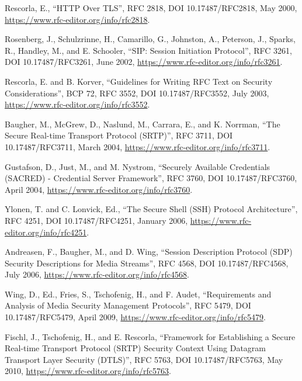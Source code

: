 \documentclass{article}
\begin{document}
\begin{description}[style=nextline, labelwidth=10em, leftmargin=10em]
\item[{[RFC2818]}] Rescorla, E., ``HTTP Over TLS'', RFC 2818,
   DOI 10.17487/RFC2818, May 2000,
   \url{https://www.rfc-editor.org/info/rfc2818}.

\item[{[RFC3261]}] Rosenberg, J., Schulzrinne, H., Camarillo, G., Johnston,
   A., Peterson, J., Sparks, R., Handley, M., and E.
   Schooler, ``SIP: Session Initiation Protocol'', RFC 3261,
   DOI 10.17487/RFC3261, June 2002,
   \url{https://www.rfc-editor.org/info/rfc3261}.

\item[{[RFC3552]}] Rescorla, E. and B. Korver, ``Guidelines for Writing RFC
   Text on Security Considerations'', BCP 72, RFC 3552,
   DOI 10.17487/RFC3552, July 2003,
   \url{https://www.rfc-editor.org/info/rfc3552}.

\item[{[RFC3711]}] Baugher, M., McGrew, D., Naslund, M., Carrara, E., and K.
   Norrman, ``The Secure Real-time Transport Protocol (SRTP)'',
   RFC 3711, DOI 10.17487/RFC3711, March 2004,
   \url{https://www.rfc-editor.org/info/rfc3711}.

\item[{[RFC3760]}] Gustafson, D., Just, M., and M. Nystrom, ``Securely
   Available Credentials (SACRED) - Credential Server
   Framework'', RFC 3760, DOI 10.17487/RFC3760, April 2004,
   \url{https://www.rfc-editor.org/info/rfc3760}.

\item[{[RFC4251]}] Ylonen, T. and C. Lonvick, Ed., ``The Secure Shell (SSH)
   Protocol Architecture'', RFC 4251, DOI 10.17487/RFC4251,
   January 2006, \url{https://www.rfc-editor.org/info/rfc4251}.

\item[{[RFC4568]}] Andreasen, F., Baugher, M., and D. Wing, ``Session
   Description Protocol (SDP) Security Descriptions for Media
   Streams'', RFC 4568, DOI 10.17487/RFC4568, July 2006,
   \url{https://www.rfc-editor.org/info/rfc4568}.

\item[{[RFC5479]}] Wing, D., Ed., Fries, S., Tschofenig, H., and F. Audet,
   ``Requirements and Analysis of Media Security Management
   Protocols'', RFC 5479, DOI 10.17487/RFC5479, April 2009,
   \url{https://www.rfc-editor.org/info/rfc5479}.

\item[{[RFC5763]}] Fischl, J., Tschofenig, H., and E. Rescorla, ``Framework
   for Establishing a Secure Real-time Transport Protocol
   (SRTP) Security Context Using Datagram Transport Layer
   Security (DTLS)'', RFC 5763, DOI 10.17487/RFC5763, May
   2010, \url{https://www.rfc-editor.org/info/rfc5763}.


\end{description}
\end{document}

